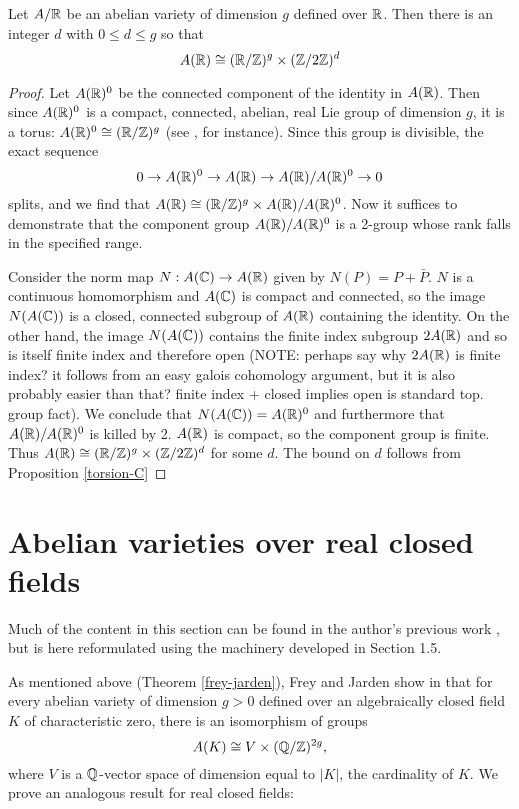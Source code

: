 \begin{theorem}
\label{structure-of-real-AVs}
Let $A/\mathbb{R}$ be an abelian variety of dimension $g$ defined over $\mathbb{R}$. Then there is an integer $d$ with $0\leq d\leq g$ so that $$A(\mathbb{R})\cong (\mathbb{R}/\mathbb{Z})^g \times (\mathbb{Z}/2\mathbb{Z})^d$$
\end{theorem}
\begin{proof}
Let $A(\mathbb{R})^0$ be the connected component of the identity in $A(\mathbb{R})$. Then since $A(\mathbb{R})^0$ is a compact, connected, abelian, real Lie group of dimension $g$, it is a torus: $A(\mathbb{R})^0\cong (\mathbb{R}/\mathbb{Z})^g$ (see \cite{compactliegroups}, for instance). Since this group is divisible, the exact sequence $$0\rightarrow A(\mathbb{R})^0 \rightarrow A(\mathbb{R})\rightarrow A(\mathbb{R})/A(\mathbb{R})^0\rightarrow 0$$ splits, and we find that $A(\mathbb{R})\cong (\mathbb{R}/\mathbb{Z})^g\times A(\mathbb{R})/A(\mathbb{R})^0$. Now it suffices to demonstrate that the component group $A(\mathbb{R})/A(\mathbb{R})^0$ is a 2-group whose rank falls in the specified range.

Consider the norm map $N:A(\mathbb{C})\rightarrow A(\mathbb{R})$ given by $N(P)=P+\bar{P}$. $N$ is a continuous homomorphism and $A(\mathbb{C})$ is compact and connected, so the image $N(A(\mathbb{C}))$ is a closed, connected subgroup of $A(\mathbb{R})$ containing the identity. On the other hand, the image $N(A(\mathbb{C}))$ contains the finite index subgroup $2A(\mathbb{R})$ and so is itself finite index and therefore open (NOTE: perhaps say why $2A(\mathbb{R})$ is finite index? it follows from an easy galois cohomology argument, but it is also probably easier than that? finite index + closed implies open is standard top. group fact). We conclude that $N(A(\mathbb{C}))=A(\mathbb{R})^0$ and furthermore that $A(\mathbb{R})/A(\mathbb{R})^0$ is killed by 2. $A(\mathbb{R})$ is compact, so the component group is finite. Thus $A(\mathbb{R})\cong (\mathbb{R}/\mathbb{Z})^g\times (\mathbb{Z}/2\mathbb{Z})^d$ for some $d$. The bound on $d$ follows from Proposition \ref{torsion-C}
\end{proof}

\section{Abelian varieties over real closed fields}
Much of the content in this section can be found in the author's previous work \cite{lowry2023abelian}, but is here reformulated using the machinery developed in Section 1.5.

As mentioned above (Theorem \ref{frey-jarden}), Frey and Jarden show in \cite{frey-jarden} that for every abelian variety of dimension $g>0$ defined over an algebraically closed field $K$ of characteristic zero, there is an isomorphism of groups $$A(K)\cong V\times(\mathbb{Q}/\mathbb{Z})^{2g},$$ where $V$ is a $\mathbb{Q}$-vector space of dimension equal to $|K|$, the cardinality of $K$. We prove an analogous result for real closed fields:

